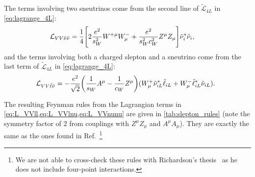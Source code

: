 The terms involving two sneutrinos come from the second line of $\tilde{\mathcal{L}}_{4L}$ in \cref{eq:lagrange_4L}:
\begin{align}
    \hspace{-0.5em} \mathcal{L}_{VV\tilde\nu\tilde\nu}
    &= \frac{1}{4} \Biggl[
        2\frac{e^2}{s_W^2} W^{+\mu}W^-_\mu
        + \frac{e^2}{s_W^2c_W^2} Z^\mu Z_\mu
    \Biggr] \tilde\nu_i^*\tilde\nu_i,
    \label{eq:L_VVnunu}
\end{align}
and the terms involving both a charged slepton and a sneutrino come from the last term of $\tilde{\mathcal{L}}_{4L}$ in \cref{eq:lagrange_4L}:
\begin{equation}
    \hspace{-0.5em} \mathcal{L}_{VV\tilde\ell\tilde\nu}
    = -\frac{e^2}{\sqrt{2}} \biggl(
        \frac{1}{s_W} A^\mu - \frac{1}{c_W} Z^\mu
    \biggr)
    (W^+_\mu \tilde\nu_{iL}^*\tilde\ell_{iL} + W^-_\mu \tilde\ell_{iL}^*\tilde\nu_{iL}).
    \label{eq:L_VVlnu}
\end{equation}

The resulting Feynman rules from the Lagrangian terms in \cref{eq:L_VVll,eq:L_VVlnu,eq:L_VVnunu} are given in \cref{tab:slepton_rules} (note the symmetry factor of $2$ from couplings with $Z^\mu Z_\mu$ and $A^\mu A_\mu$).
They are exactly the same as the ones found in Ref.~\cite{Rosiek:1989sce}\footnote{
    We are not able to cross-check these rules with Richardson's thesis~\cite{Richardson:2000nt} as he does not include four-point interactions.
}

